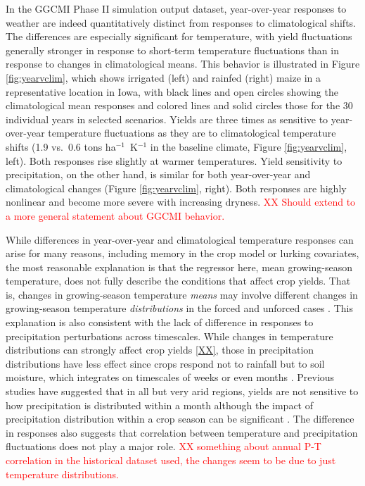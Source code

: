 \documentclass[gmd, manuscript]{copernicus} %
\begin{document}
In the GGCMI Phase II simulation output dataset, year-over-year responses to weather are indeed quantitatively distinct from  responses to climatological shifts. 
The differences are especially significant for temperature, with yield fluctuations generally stronger in response to short-term temperature fluctuations than in response to changes in climatological means. 
This behavior is illustrated in Figure \ref{fig:yearvclim}, which shows irrigated (left) and rainfed (right) maize in a representative location in Iowa, with black lines and open circles showing the climatological mean responses and colored lines and solid circles those for the 30 individual years in selected scenarios. Yields are three times as sensitive to year-over-year temperature fluctuations as they are to climatological  temperature shifts (1.9 vs.\ 0.6 tons ha$^{-1}$\ K$^{-1}$ in the baseline climate, Figure \ref{fig:yearvclim}, left). Both responses rise slightly at warmer temperatures.
Yield sensitivity to precipitation, on the other hand, is similar for both year-over-year and climatological changes (Figure \ref{fig:yearvclim}, right). Both responses are highly nonlinear and become more severe with increasing dryness. 
\textcolor{red}{XX Should extend to a more general statement about GGCMI behavior.}

While differences in year-over-year and climatological temperature responses can arise for many reasons, including memory in the crop model or lurking covariates,  the most reasonable explanation is that the regressor here, mean growing-season temperature, does not fully describe the conditions that affect crop yields. That is, changes in growing-season temperature \textit{means}  may involve different changes in growing-season temperature \textit{distributions} in the forced and unforced cases \citep[e.g.][]{Ruane2016}. 
This explanation is also consistent with the lack of difference in responses to precipitation perturbations across timescales.  While changes in temperature distributions can strongly affect crop yields \ref{XX}, those in precipitation distributions have less effect since crops respond not to rainfall but to soil moisture, which integrates on timescales of weeks or even months \citep[e.g.][]{potter2005effects}. %
Previous studies have suggested that in all but very arid regions, yields are not sensitive to how precipitation is distributed within a month \citep{Glotter14} although the impact of precipitation distribution within a crop season can be significant \citep{CHALLINOR200499}. The difference in responses also suggests that correlation between temperature and precipitation fluctuations does not play a major role. \textcolor{red}{XX something about annual P-T correlation in the historical dataset used, the changes seem to be due to just temperature distributions.}
\end{document}
